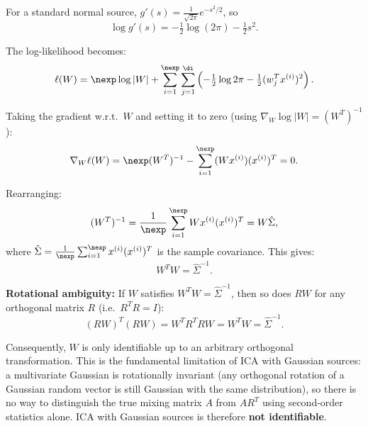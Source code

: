 \begin{answer}
For a standard normal source, $g'(s) = \frac{1}{\sqrt{2\pi}}e^{-s^2/2}$, so
$$\log g'(s) = -\tfrac{1}{2}\log(2\pi) - \tfrac{1}{2}s^2.$$

The log-likelihood becomes:
$$\ell(W) = \nexp\log|W| + \sum_{i=1}^\nexp\sum_{j=1}^\di \left(-\tfrac{1}{2}\log 2\pi - \tfrac{1}{2}(w_j^T x^{(i)})^2\right).$$

Taking the gradient w.r.t.\ $W$ and setting it to zero (using $\nabla_W \log|W| = (W^T)^{-1}$):
$$\nabla_W\ell(W) = \nexp(W^T)^{-1} - \sum_{i=1}^\nexp (Wx^{(i)})(x^{(i)})^T = 0.$$

Rearranging:
$$(W^T)^{-1} = \frac{1}{\nexp}\sum_{i=1}^\nexp Wx^{(i)}(x^{(i)})^T = W\hat{\Sigma},$$
where $\hat{\Sigma} = \frac{1}{\nexp}\sum_{i=1}^\nexp x^{(i)}(x^{(i)})^T$ is the sample covariance. This gives:
$$W^T W = \hat{\Sigma}^{-1}.$$

\textbf{Rotational ambiguity:} If $W$ satisfies $W^TW = \hat{\Sigma}^{-1}$, then so does $RW$ for any orthogonal matrix $R$ (i.e.\ $R^TR = I$):
$$(RW)^T(RW) = W^TR^TRW = W^TW = \hat{\Sigma}^{-1}.$$

Consequently, $W$ is only identifiable up to an arbitrary orthogonal transformation. This is the fundamental limitation of ICA with Gaussian sources: a multivariate Gaussian is rotationally invariant (any orthogonal rotation of a Gaussian random vector is still Gaussian with the same distribution), so there is no way to distinguish the true mixing matrix $A$ from $AR^T$ using second-order statistics alone. ICA with Gaussian sources is therefore \textbf{not identifiable}.
\end{answer}
